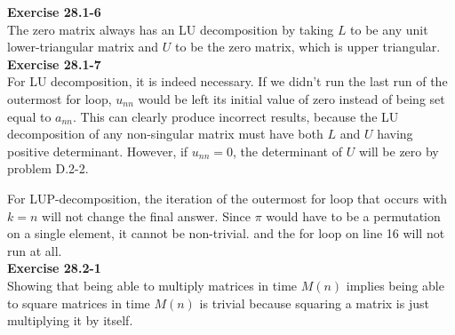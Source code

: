\documentclass{article}
\begin{document}
\noindent\textbf{Exercise 28.1-6}\\

The zero matrix always has an LU decomposition by taking $L$ to be any unit lower-triangular matrix and $U$ to be the zero matrix, which is upper triangular. \\

\noindent\textbf{Exercise 28.1-7}\\

For LU decomposition, it is indeed necessary. If we didn't run the last run of the outermost for loop, $u_{nn}$ would be left its initial value of zero instead of being set equal to $a_{nn}$. This can clearly produce incorrect results, because the LU decomposition of any non-singular matrix must have both $L$ and $U$ having positive determinant. However, if $u_{nn}=0$, the determinant of $U$ will be zero by problem D.2-2.

For LUP-decomposition, the iteration of the outermost for loop that occurs with $k=n$ will not change the final answer. Since $\pi$ would have to be a permutation on a single element, it cannot be non-trivial. and the for loop on line 16 will not run at all.\\



\noindent\textbf{Exercise 28.2-1}\\

Showing that being able to multiply matrices in time $M(n)$ implies being able to square matrices in time $M(n)$ is trivial because squaring a matrix is just multiplying it by itself.
\end{document}
